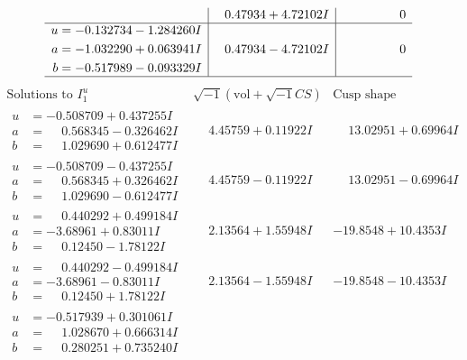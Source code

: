 \documentclass[1p]{elsarticle_modified}
\theoremstyle{definition}
\newcommand{\I}{\sqrt{-1}}
\begin{document}
$$\begin{array}{c|c|c}
 & \phantom{-}0.47934 + 4.72102 I & \phantom{-0.000000 } 0 \\ \hline\begin{aligned}
u &= -0.132734 - 1.284260 I \\
a &= -1.032290 + 0.063941 I \\
b &= -0.517989 - 0.093329 I\end{aligned}
 & \phantom{-}0.47934 - 4.72102 I & \phantom{-0.000000 } 0\\
 \hline 
 \end{array}$$\newpage$$\begin{array}{c|c|c}  
\text{Solutions to }I^u_{1}& \I (\text{vol} + \sqrt{-1}CS) & \text{Cusp shape}\\
 \hline 
\begin{aligned}
u &= -0.508709 + 0.437255 I \\
a &= \phantom{-}0.568345 - 0.326462 I \\
b &= \phantom{-}1.029690 + 0.612477 I\end{aligned}
 & \phantom{-}4.45759 + 0.11922 I & \phantom{-}13.02951 + 0.69964 I \\ \hline\begin{aligned}
u &= -0.508709 - 0.437255 I \\
a &= \phantom{-}0.568345 + 0.326462 I \\
b &= \phantom{-}1.029690 - 0.612477 I\end{aligned}
 & \phantom{-}4.45759 - 0.11922 I & \phantom{-}13.02951 - 0.69964 I \\ \hline\begin{aligned}
u &= \phantom{-}0.440292 + 0.499184 I \\
a &= -3.68961 + 0.83011 I \\
b &= \phantom{-}0.12450 - 1.78122 I\end{aligned}
 & \phantom{-}2.13564 + 1.55948 I & -19.8548 + 10.4353 I \\ \hline\begin{aligned}
u &= \phantom{-}0.440292 - 0.499184 I \\
a &= -3.68961 - 0.83011 I \\
b &= \phantom{-}0.12450 + 1.78122 I\end{aligned}
 & \phantom{-}2.13564 - 1.55948 I & -19.8548 - 10.4353 I \\ \hline\begin{aligned}
u &= -0.517939 + 0.301061 I \\
a &= \phantom{-}1.028670 + 0.666314 I \\
b &= \phantom{-}0.280251 + 0.735240 I\end{aligned}

\end{array}$$
\end{document}
